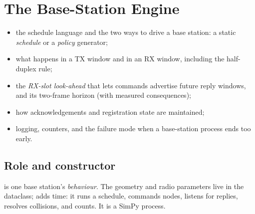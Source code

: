 \chapter{The Base-Station Engine}
\label{ch:bsengine}

\begin{defbox}
\begin{itemize}
 \item the schedule language and the two ways to drive a base station: a static \emph{schedule} or a \emph{policy} generator;
 \item what happens in a TX window and in an RX window, including the half-duplex rule;
 \item the \emph{RX-slot look-ahead} that lets commands advertise future reply windows, and its two-frame horizon (with measured consequences);
 \item how acknowledgements and registration state are maintained;
 \item logging, counters, and the failure mode when a base-station process ends too early.
\end{itemize}
\end{defbox}

\section{Role and constructor}
\label{sec:bsctor}

 is one base station's \emph{behaviour}. The geometry and radio parameters live in the  dataclass;  adds time: it runs a schedule, commands nodes, listens for replies, resolves collisions, and counts. It is a SimPy process.

